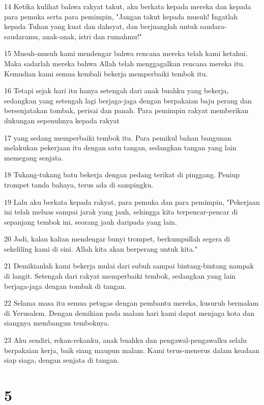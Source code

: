 \par 14 Ketika kulihat bahwa rakyat takut, aku berkata kepada mereka dan kepada para pemuka serta para pemimpin, "Jangan takut kepada musuh! Ingatlah kepada Tuhan yang kuat dan dahsyat, dan berjuanglah untuk saudara-saudaramu, anak-anak, istri dan rumahmu!"
\par 15 Musuh-musuh kami mendengar bahwa rencana mereka telah kami ketahui. Maka sadarlah mereka bahwa Allah telah menggagalkan rencana mereka itu. Kemudian kami semua kembali bekerja memperbaiki tembok itu.
\par 16 Tetapi sejak hari itu hanya setengah dari anak buahku yang bekerja, sedangkan yang setengah lagi berjaga-jaga dengan berpakaian baju perang dan bersenjatakan tombak, perisai dan panah. Para pemimpin rakyat memberikan dukungan sepenuhnya kepada rakyat
\par 17 yang sedang memperbaiki tembok itu. Para pemikul bahan bangunan melakukan pekerjaan itu dengan satu tangan, sedangkan tangan yang lain memegang senjata.
\par 18 Tukang-tukang batu bekerja dengan pedang terikat di pinggang. Peniup trompet tanda bahaya, terus ada di sampingku.
\par 19 Lalu aku berkata kepada rakyat, para pemuka dan para pemimpin, "Pekerjaan ini telah meluas sampai jarak yang jauh, sehingga kita terpencar-pencar di sepanjang tembok ini, seorang jauh daripada yang lain.
\par 20 Jadi, kalau kalian mendengar bunyi trompet, berkumpullah segera di sekeliling kami di sini. Allah kita akan berperang untuk kita."
\par 21 Demikianlah kami bekerja mulai dari subuh sampai bintang-bintang nampak di langit. Setengah dari rakyat memperbaiki tembok, sedangkan yang lain berjaga-jaga dengan tombak di tangan.
\par 22 Selama masa itu semua petugas dengan pembantu mereka, kusuruh bermalam di Yerusalem. Dengan demikian pada malam hari kami dapat menjaga kota dan siangnya membangun temboknya.
\par 23 Aku sendiri, rekan-rekanku, anak buahku dan pengawal-pengawalku selalu berpakaian kerja, baik siang maupun malam. Kami terus-menerus dalam keadaan siap siaga, dengan senjata di tangan.

\chapter{5}

